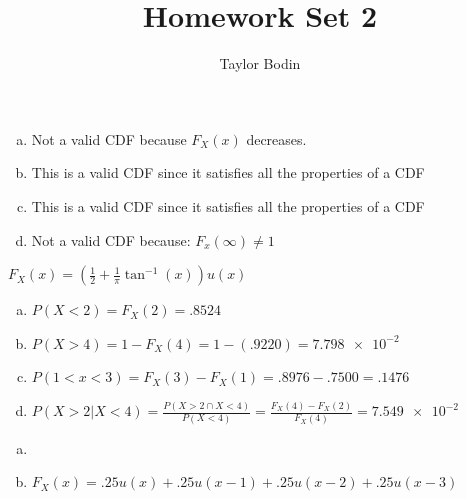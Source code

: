 \documentclass[12pt]{article}
\newenvironment{problem}[2][Problem]{\begin{trivlist}
\item[\hskip \labelsep {\bfseries #1}\hskip \labelsep {\bfseries #2.}]
  \vspace{1 cm}
}{\end{trivlist}}
\begin{document}
\title{Homework Set 2}
\author{Taylor Bodin}
\maketitle

\begin{problem}{3.1}
\item
  \begin{enumerate}[a.]
    \item %
      Not a valid CDF because $F_X(x)$ decreases.
    \item %
      This is a valid CDF since it satisfies all the properties of a CDF
    \item %
      This is a valid CDF since it satisfies all the properties of a CDF
    \item %
      Not a valid CDF because: $F_x(\infty) \neq 1$
  \end{enumerate}
\end{problem}

\begin{problem}{3.3}
\item
  $F_X(x) = \left(\frac{1}{2} + \frac{1}{\pi}\tan^{-1}(x)\right)u(x)$
  \begin{enumerate}[a.]
    \item %
      $P(X < 2) = F_X(2) = .8524$
    \item %
      $P(X>4) = 1-F_X(4) = 1 - (.9220) = \num{7.798e-2}$
    \item %
      $P(1<x<3) = F_X(3) - F_X(1) = .8976 - .7500 = .1476$
    \item %
      $P(X>2 | X<4) = \frac{P(X>2 \cap X<4)}{P(X<4)} = \frac{F_X(4)
      -F_X(2)}{F_X(4)} = \num{7.549e-2}$
  \end{enumerate} 
\end{problem}

\begin{problem}{3.5} %
\item
  \begin{enumerate}[a.] 
    \item %
    \item %
      $F_X(x) = .25u(x) + .25u(x-1) + .25u(x-2) +.25u(x-3)$
  \end{enumerate}
\end{problem}
\end{document}
